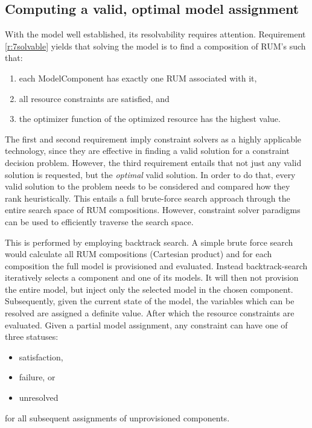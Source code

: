 \subsection{Computing a valid, optimal model assignment}
With the model well established, its resolvability requires attention. Requirement \ref{r:7solvable} yields that solving the model is to find a composition of RUM's such that:
\begin{enumerate}
\nospace
\item each ModelComponent has exactly one RUM associated with it,
\item all resource constraints are satisfied, and
\item the optimizer function of the optimized resource has the highest value.
\end{enumerate}
The first and second requirement imply constraint solvers as a highly applicable technology, since they are effective in finding a valid solution for a constraint decision problem. However, the third requirement entails that not just any valid solution is requested, but the \emph{optimal} valid solution. In order to do that, every valid solution to the problem needs to be considered and compared how they rank heuristically. This entails a full brute-force search approach through the entire search space of RUM compositions. However, constraint solver paradigms can be used to efficiently traverse the search space.

This is performed by employing backtrack search. A simple brute force search would calculate all RUM compositions (Cartesian product) and for each composition the full model is provisioned and evaluated. Instead backtrack-search iteratively selects a component and one of its models. It will then not provision the entire model, but inject only the selected model in the chosen component. Subsequently, given the current state of the model, the variables which can be resolved are assigned a definite value. After which the resource constraints are evaluated. Given a partial model assignment, any constraint can have one of three statuses:
\begin{itemize}
\nospace
\item satisfaction,
\item failure, or
\item unresolved
\end{itemize}
for all subsequent assignments of unprovisioned components.


